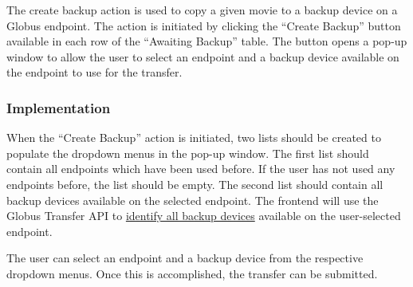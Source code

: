 The create backup action is used to copy a given movie to a backup device on a Globus
endpoint. The action is initiated by clicking the ``Create Backup'' button available 
in each row of the ``Awaiting Backup'' table. The button opens a pop-up window to
allow the user to select an endpoint and a backup device available on the endpoint 
to use for the transfer.

\subsubsection{Implementation}

When the ``Create Backup'' action is initiated, two lists should be created to populate
the dropdown menus in the pop-up window. The first list should contain all endpoints
which have been used before. If the user has not used any endpoints before, the list
should be empty. The second list should contain all backup devices available on the
selected endpoint. The frontend will use the Globus Transfer API to 
\href{appendix:identifybackupdevices}{identify all backup devices} available on the 
user-selected endpoint.

The user can select an endpoint and a backup device from the respective dropdown menus.
Once this is accomplished, the transfer can be submitted.
